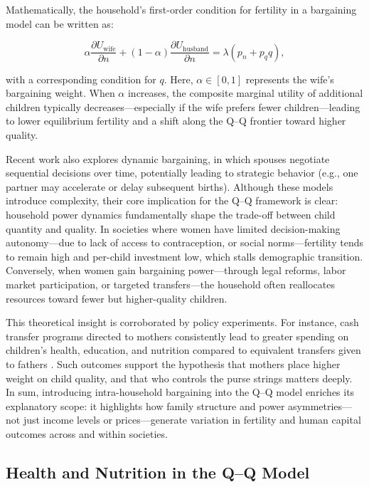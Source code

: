 \documentclass[]{AEA}
\begin{document}
Mathematically, the household's first-order condition for fertility in a
bargaining model can be written as:

\[
\alpha \frac{\partial U_{\text{wife}}}{\partial n} + (1 - \alpha) \frac{\partial U_{\text{husband}}}{\partial n} = \lambda(p_n + p_q q),
\]

with a corresponding condition for \(q\). Here, \(\alpha \in [0,1]\)
represents the wife's bargaining weight. When \(\alpha\) increases, the
composite marginal utility of additional children typically
decreases---especially if the wife prefers fewer children---leading to
lower equilibrium fertility and a shift along the Q--Q frontier toward
higher quality.

Recent work also explores dynamic bargaining, in which spouses negotiate
sequential decisions over time, potentially leading to strategic
behavior (e.g., one partner may accelerate or delay subsequent births).
Although these models introduce complexity, their core implication for
the Q--Q framework is clear: household power dynamics fundamentally
shape the trade-off between child quantity and quality. In societies
where women have limited decision-making autonomy---due to lack of
access to contraception, or social norms---fertility tends to remain
high and per-child investment low, which stalls demographic transition.
Conversely, when women gain bargaining power---through legal reforms,
labor market participation, or targeted transfers---the household often
reallocates resources toward fewer but higher-quality children.

This theoretical insight is corroborated by policy experiments. For
instance, cash transfer programs directed to mothers consistently lead
to greater spending on children's health, education, and nutrition
compared to equivalent transfers given to fathers
\citep{duflo2003grandmothers, thomas1990intra} . Such outcomes support
the hypothesis that mothers place higher weight on child quality, and
that who controls the purse strings matters deeply. In sum, introducing
intra-household bargaining into the Q--Q model enriches its explanatory
scope: it highlights how family structure and power asymmetries---not
just income levels or prices---generate variation in fertility and human
capital outcomes across and within societies.

\subsection{Health and Nutrition in the Q–Q Model}
\end{document}
